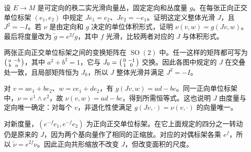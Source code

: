 \begin{exercise}
	\label{g1:ex:oriented-plane-complex-structure}
	设 \(E\to M\) 是可定向的秩二实光滑向量丛，固定定向和丛度量 \(g\)。在每张正向正交单位标架 \((e_1,e_2)\) 中规定 \(Je_1=e_2\)、\(Je_2=-e_1\)。证明这定义整体光滑 \(J\)，且 \(J^2=-I\)。若 \(\nu\) 是由定向和 \(g\) 决定的单位体积形式，证明 \(\nu(v,w)=g(Jv,w)\)。最后将度量改为 \(\widetilde g=e^{2f}g\)，其中 \(f\) 光滑，比较两者对应的 \(J\) 与体积形式。
\end{exercise}
\begin{solution}
	两张正向正交单位标架之间的变换矩阵在 \(\operatorname{SO}(2)\) 中。任一这样的矩阵都可写为 \(\begin{psmallmatrix}a&-b\\b&a\end{psmallmatrix}\)，其中 \(a^2+b^2=1\)，它与 \(J_0=\begin{psmallmatrix}0&-1\\1&0\end{psmallmatrix}\) 交换。因此各图中规定的 \(J\) 在交叠处一致，且局部矩阵恒为 \(J_0\)，所以 \(J\) 整体光滑并满足 \(J^2=-I\)。

	对 \(v=ae_1+be_2\)、\(w=ce_1+de_2\)，有 \(g(Jv,w)=ad-bc\)。同一正向单位标架中，\(\nu=e^1\wedge e^2\)，故 \(\nu(v,w)=ad-bc\)，得到所需恒等式。这也说明 \(J\) 由度量与定向唯一确定：对每个 \(v\)，非退化性使满足 \(g(Jv,\cdot)=\nu(v,\cdot)\) 的向量唯一。

	对新度量，\((e^{-f}e_1,e^{-f}e_2)\) 为正向正交单位标架。在它上面规定的四分之一转动仍是原来的 \(J\)，因为两个基向量作了相同的正缩放。对应的对偶标架各乘 \(e^f\)，所以 \(\widetilde\nu=e^{2f}\nu\)。因此正向共形缩放不改变 \(J\)，但改变面积的尺度。
\end{solution}

